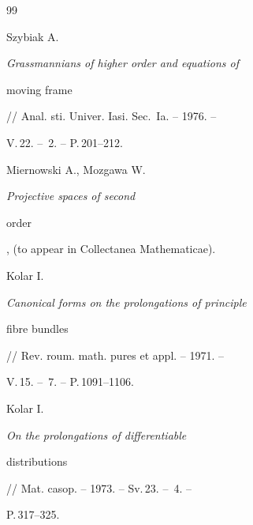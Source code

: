 \begin{thebibliography}{99}


Szybiak A. {\em Grassmannians of higher order and equations of


moving frame} // Anal. sti. Univer. Iasi. Sec.~Ia. -- 1976. --


V.\,22. -- \No\,2. -- P.\,201--212.







Miernowski A., Mozgawa W. {\em Projective spaces of second


order}, (to appear in Collectanea Mathematicae).







Kolar I. {\em Canonical forms on the prolongations of principle


fibre bundles} // Rev. roum. math. pures et appl. -- 1971. --


V.\,15. -- \No\,7. -- P.\,1091--1106.







Kolar I. {\em On the prolongations of differentiable


distributions} // Mat. casop. -- 1973. -- Sv.\,23. -- \No\,4. --


P.\,317--325.











\end{thebibliography}





\vskip 2cm















\label{end}











